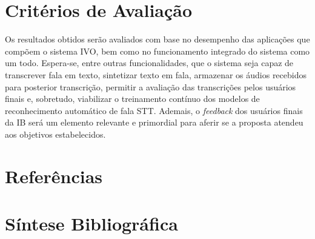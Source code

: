 \documentclass[
	12pt,				%
	a4paper,			%
	english,			%
	brazil,				%
	]{article}
\begin{document}
\section{Critérios de Avaliação} 
     
Os resultados obtidos serão avaliados com base no desempenho das aplicações que compõem o sistema IVO, bem como no funcionamento integrado do sistema como um todo. Espera-se, entre outras funcionalidades, que o sistema seja capaz de transcrever fala em texto, sintetizar texto em fala, armazenar os áudios recebidos para posterior transcrição, permitir a avaliação das transcrições pelos usuários finais e, sobretudo, viabilizar o treinamento contínuo dos modelos de reconhecimento automático de fala STT. Ademais, o \textit{feedback} dos usuários finais da IB será um elemento relevante e primordial para aferir se a proposta atendeu aos objetivos estabelecidos.

\renewcommand\refname{}
\section{Referências}

    \vspace{-4.3em}
    
    
\section{Síntese Bibliográfica}

    \vspace{-3.5em}
    
 
\end{document}
